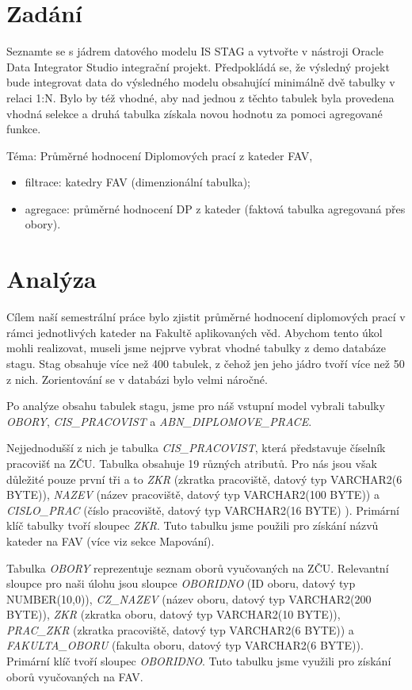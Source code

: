 \section{Zadání}

Seznamte se s jádrem datového modelu IS STAG a vytvořte v nástroji Oracle Data Integrator Studio integrační projekt.
Předpokládá se, že výsledný projekt bude integrovat data do výsledného modelu obsahující minimálně dvě tabulky v relaci 1:N.
Bylo by též vhodné, aby nad jednou z těchto tabulek byla provedena vhodná selekce a druhá tabulka získala novou hodnotu za pomoci agregované funkce.

Téma: Průměrné hodnocení Diplomových prací z kateder FAV,

\begin{itemize}
    \item filtrace: katedry FAV (dimenzionální tabulka);
    \item agregace: průměrné hodnocení DP z kateder (faktová tabulka agregovaná přes obory).
\end{itemize}

\section{Analýza}
Cílem naší semestrální práce bylo zjistit průměrné hodnocení diplomových prací v rámci jednotlivých kateder na Fakultě aplikovaných věd.
Abychom tento úkol mohli realizovat, museli jsme nejprve vybrat vhodné tabulky z demo databáze stagu.
Stag obsahuje více než 400 tabulek, z čehož jen jeho jádro tvoří více než 50 z nich.
Zorientování se v databázi bylo velmi náročné.

Po analýze obsahu tabulek stagu, jsme pro náš vstupní model vybrali tabulky \textit{OBORY}, \textit{CIS\_PRACOVIST} a \textit{ABN\_DIPLOMOVE\_PRACE}.

Nejjednodušší z nich je tabulka \textit{CIS\_PRACOVIST}, která představuje číselník pracovišť na ZČU.
Tabulka obsahuje 19 různých atributů.
Pro nás jsou však důležité pouze první tři a to \textit{ZKR} (zkratka pracoviště, datový typ VARCHAR2(6 BYTE)), \textit{NAZEV} (název pracoviště, datový typ VARCHAR2(100 BYTE)) a \textit{CISLO\_PRAC} (číslo pracoviště, datový typ VARCHAR2(16 BYTE) ).
Primární klíč tabulky tvoří sloupec \textit{ZKR}.
Tuto tabulku jsme použili pro získání názvů kateder na FAV (více viz sekce Mapování).

Tabulka \textit{OBORY} reprezentuje seznam oborů vyučovaných na ZČU.
Relevantní sloupce pro naši úlohu jsou sloupce \textit{OBORIDNO} (ID oboru, datový typ NUMBER(10,0)), \textit{CZ\_NAZEV} (název oboru, datový typ VARCHAR2(200 BYTE)), \textit{ZKR} (zkratka oboru, datový typ VARCHAR2(10 BYTE)), \textit{PRAC\_ZKR} (zkratka pracoviště, datový typ VARCHAR2(6 BYTE)) a \textit{FAKULTA\_OBORU} (fakulta oboru, datový typ VARCHAR2(6 BYTE)).
Primární klíč tvoří sloupec \textit{OBORIDNO}.
Tuto tabulku jsme využili pro získání oborů vyučovaných na FAV.

